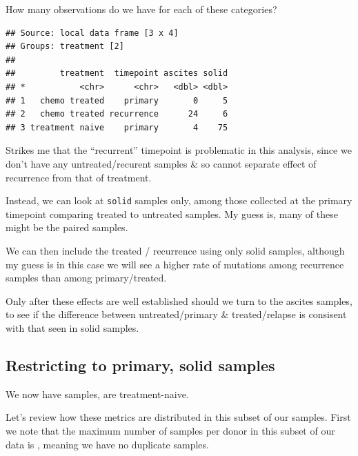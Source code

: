 \documentclass[]{article}
\newenvironment{Shaded}{\begin{snugshade}}{\end{snugshade}}
\newcommand{\KeywordTok}[1]{\textcolor[rgb]{0.13,0.29,0.53}{\textbf{{#1}}}}
\newcommand{\DataTypeTok}[1]{\textcolor[rgb]{0.13,0.29,0.53}{{#1}}}
\newcommand{\DecValTok}[1]{\textcolor[rgb]{0.00,0.00,0.81}{{#1}}}
\newcommand{\StringTok}[1]{\textcolor[rgb]{0.31,0.60,0.02}{{#1}}}
\newcommand{\NormalTok}[1]{{#1}}
\begin{document}
How many observations do we have for each of these categories?

\begin{Shaded}
\end{Shaded}

\begin{verbatim}
## Source: local data frame [3 x 4]
## Groups: treatment [2]
## 
##         treatment  timepoint ascites solid
## *           <chr>      <chr>   <dbl> <dbl>
## 1   chemo treated    primary       0     5
## 2   chemo treated recurrence      24     6
## 3 treatment naive    primary       4    75
\end{verbatim}

Strikes me that the ``recurrent'' timepoint is problematic in this
analysis, since we don't have any untreated/recurent samples \& so
cannot separate effect of recurrence from that of treatment.

Instead, we can look at \texttt{solid} samples only, among those
collected at the primary timepoint comparing treated to untreated
samples. My guess is, many of these might be the paired samples.

We can then include the treated / recurrence using only solid samples,
although my guess is in this case we will see a higher rate of mutations
among recurrence samples than among primary/treated.

Only after these effects are well established should we turn to the
ascites samples, to see if the difference between untreated/primary \&
treated/relapse is consisent with that seen in solid samples.

\subsection{Restricting to primary, solid
samples}\label{restricting-to-primary-solid-samples}

We now have samples, are treatment-naive.

Let's review how these metrics are distributed in this subset of our
samples. First we note that the maximum number of samples per donor in
this subset of our data is , meaning we have no duplicate samples.
\end{document}

